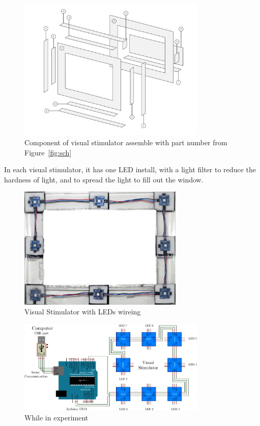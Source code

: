 \begin{figure}[ht]
	\centering
	\includegraphics[width=0.8\textwidth]{chapter6/component.pdf}
	\caption{Component of visual stimulator assemble with part number from Figure~\ref{fig:sch} }
\end{figure}

In each visual stimulator, it has one LED install, with a light filter to reduce the hardness of light, and to spread the light to fill out the window.
\begin{figure}[ht]
	\centering
	\includegraphics[width=0.7\textwidth]{chapter6/frame_LED.jpg}
	\caption{Visual Stimulator with LEDs wireing}
\end{figure}

\begin{figure}[ht]
	\centering
	\includegraphics[width=0.8\textwidth]{chapter6/arduinosheet.pdf}
	\caption{While in experiment}
\end{figure}

